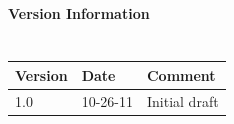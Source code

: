 \documentclass[11pt]{article}
\begin{document}
\tableofcontents			%
\setcounter{tocdepth}{1}		%

\newpage
\paragraph{Version Information\\\\} 
\begin{tabular}{|p{1.5cm}|p{1.5cm}|p{10cm}|} \hline
Version & Date & Comment \\ \hline
1.0 & 10-26-11 & Initial draft \\

\hline
\end{tabular}

\newpage
{}
\setcounter{page}{1}

						

\newpage




%



%





\newpage

						
\end{document}
